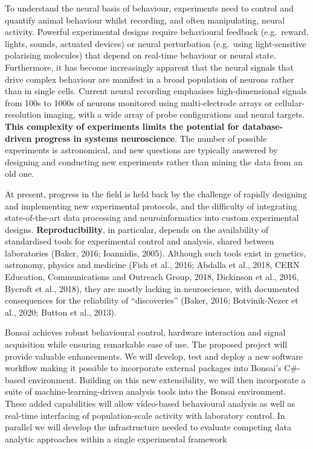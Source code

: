To understand the neural basis of behaviour, experiments need to control and quantify animal behaviour whilst recording, and often manipulating, neural activity. 
%
Powerful experimental designs require behavioural feedback (e.g.\ reward, lights, sounds, actuated
devices) or neural perturbation (e.g.\ using light-sensitive polarising
molecules) that depend on real-time behaviour or neural state.
%
Furthermore, it has become increasingly apparent that the neural signals that
drive complex behaviour are manifest in a broad population of neurons rather
than in single cells. Current neural recording emphasises high-dimensional
signals from 100s to 1000s of neurons monitored using multi-electrode arrays or cellular-resolution imaging, with a wide array of probe configurations and neural targets.
%
\textbf{This complexity of experiments limits the potential for database-driven progress in systems neuroscience}. The number of possible experiments is astronomical, and new questions are typically answered by designing and conducting new experiments rather than mining the data from an old one.





At present, progress in the field is held back by the challenge of rapidly designing and implementing new experimental protocols, and the difficulty of integrating state-of-the-art data processing and
neuroinformatics into custom experimental designs.
%
\textbf{Reproducibility}, in particular, depends on the availability of standardised tools for experimental control and analysis, shared between laboratories (Baker, 2016; Ioannidis, 2005). Although such tools exist in genetics, astronomy, physics and medicine (Fish et al., 2016; Abdalla et al., 2018, CERN Education, Communications and Outreach Group, 2018, Dickinson et al., 2016, Bycroft et al., 2018), they are mostly lacking in neuroscience, with documented consequences for the reliability of ``discoveries'' (Baker, 2016; Botvinik-Nezer et al., 2020; Button et al., 2013). 




Bonsai achieves robust behavioural control, hardware interaction and signal acquisition while ensuring remarkable ease of use.  The proposed project will provide valuable enhancements.  We will develop, test and deploy a new software workflow making it possible to incorporate external packages into Bonsai's C\#-based environment.  Building on this new extensibility, we will then incorporate a suite of machine-learning-driven analysis tools into the Bonsai environment.  These added capabilities will allow  video-based behavioural analysis as well as real-time interfacing of population-scale activity with laboratory control.  In parallel we will develop the infrastructure needed to evaluate competing data analytic approaches within a single experimental framework

